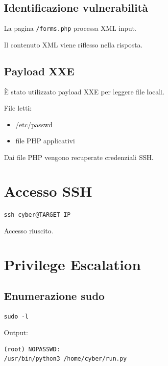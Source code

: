 \documentclass[a4paper,11pt]{article}
\begin{document}
\subsection{Identificazione vulnerabilità}

La pagina \texttt{/forms.php} processa XML input.

Il contenuto XML viene riflesso nella risposta.

\subsection{Payload XXE}

È stato utilizzato payload XXE per leggere file locali.

File letti:
\begin{itemize}
    \item /etc/passwd
    \item file PHP applicativi
\end{itemize}

Dai file PHP vengono recuperate credenziali SSH.

\section{Accesso SSH}

\begin{lstlisting}
ssh cyber@TARGET_IP
\end{lstlisting}

Accesso riuscito.

\section{Privilege Escalation}

\subsection{Enumerazione sudo}

\begin{lstlisting}
sudo -l
\end{lstlisting}

Output:

\begin{lstlisting}
(root) NOPASSWD:
/usr/bin/python3 /home/cyber/run.py
\end{lstlisting}
\end{document}
